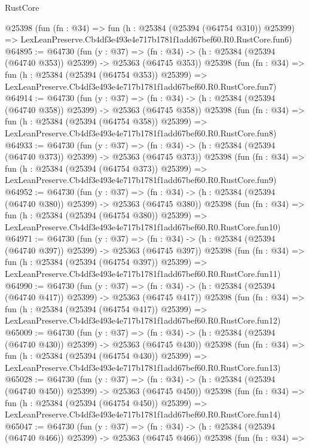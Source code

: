 \begin{lexlean}{RustCore}
\begin{coremodule}
    @25398
    (fun (fn : @34) =>
    fun (h : @25384 (@25394 (@64754 @310)) @25399) =>
    LexLeanPreserve.Cb4df3e493e4e717b1781f1add67bef60.R0.RustCore.fun6)
@64895 := @64730
    (fun (y : @37) =>
    (fn : @34) -> (h : @25384 (@25394 (@64740 @353)) @25399) -> @25363 (@64745 @353))
    @25398
    (fun (fn : @34) =>
    fun (h : @25384 (@25394 (@64754 @353)) @25399) =>
    LexLeanPreserve.Cb4df3e493e4e717b1781f1add67bef60.R0.RustCore.fun7)
@64914 := @64730
    (fun (y : @37) =>
    (fn : @34) -> (h : @25384 (@25394 (@64740 @358)) @25399) -> @25363 (@64745 @358))
    @25398
    (fun (fn : @34) =>
    fun (h : @25384 (@25394 (@64754 @358)) @25399) =>
    LexLeanPreserve.Cb4df3e493e4e717b1781f1add67bef60.R0.RustCore.fun8)
@64933 := @64730
    (fun (y : @37) =>
    (fn : @34) -> (h : @25384 (@25394 (@64740 @373)) @25399) -> @25363 (@64745 @373))
    @25398
    (fun (fn : @34) =>
    fun (h : @25384 (@25394 (@64754 @373)) @25399) =>
    LexLeanPreserve.Cb4df3e493e4e717b1781f1add67bef60.R0.RustCore.fun9)
@64952 := @64730
    (fun (y : @37) =>
    (fn : @34) -> (h : @25384 (@25394 (@64740 @380)) @25399) -> @25363 (@64745 @380))
    @25398
    (fun (fn : @34) =>
    fun (h : @25384 (@25394 (@64754 @380)) @25399) =>
    LexLeanPreserve.Cb4df3e493e4e717b1781f1add67bef60.R0.RustCore.fun10)
@64971 := @64730
    (fun (y : @37) =>
    (fn : @34) -> (h : @25384 (@25394 (@64740 @397)) @25399) -> @25363 (@64745 @397))
    @25398
    (fun (fn : @34) =>
    fun (h : @25384 (@25394 (@64754 @397)) @25399) =>
    LexLeanPreserve.Cb4df3e493e4e717b1781f1add67bef60.R0.RustCore.fun11)
@64990 := @64730
    (fun (y : @37) =>
    (fn : @34) -> (h : @25384 (@25394 (@64740 @417)) @25399) -> @25363 (@64745 @417))
    @25398
    (fun (fn : @34) =>
    fun (h : @25384 (@25394 (@64754 @417)) @25399) =>
    LexLeanPreserve.Cb4df3e493e4e717b1781f1add67bef60.R0.RustCore.fun12)
@65009 := @64730
    (fun (y : @37) =>
    (fn : @34) -> (h : @25384 (@25394 (@64740 @430)) @25399) -> @25363 (@64745 @430))
    @25398
    (fun (fn : @34) =>
    fun (h : @25384 (@25394 (@64754 @430)) @25399) =>
    LexLeanPreserve.Cb4df3e493e4e717b1781f1add67bef60.R0.RustCore.fun13)
@65028 := @64730
    (fun (y : @37) =>
    (fn : @34) -> (h : @25384 (@25394 (@64740 @450)) @25399) -> @25363 (@64745 @450))
    @25398
    (fun (fn : @34) =>
    fun (h : @25384 (@25394 (@64754 @450)) @25399) =>
    LexLeanPreserve.Cb4df3e493e4e717b1781f1add67bef60.R0.RustCore.fun14)
@65047 := @64730
    (fun (y : @37) =>
    (fn : @34) -> (h : @25384 (@25394 (@64740 @466)) @25399) -> @25363 (@64745 @466))
    @25398
    (fun (fn : @34) =>

\end{coremodule}
\end{lexlean}
